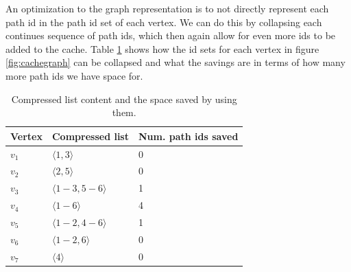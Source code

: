 An optimization to the graph representation is to not directly represent each path id in the path id set of each vertex. We can do this by collapsing each continues sequence of path ids, which then again allow for even more ids to be added to the cache. Table \ref{tab:compressedlist} shows how the id sets for each vertex in figure \ref{fig:cachegraph} can be collapsed and what the savings are in terms of how many more path ids we have space for.




\begin{table}
\center
\begin{tabular}{|l|l|l|}\hline
Vertex 	& Compressed list & Num. path ids saved \\\hline
$v_1$ 	& $\langle 1, 3 \rangle$ 	& 0 \\\hline
$v_2$ 	& $\langle2, 5 \rangle$ 	& 0 \\\hline
$v_3$ 	& $\langle 1-3, 5-6 \rangle$ 	& 1 \\\hline
$v_4$ 	& $\langle 1-6 \rangle$ 	& 4 \\\hline
$v_5$ 	& $\langle 1-2, 4-6 \rangle$ 	& 1 \\\hline
$v_6$ 	& $\langle 1-2, 6 \rangle$ 	& 0 \\\hline
$v_7$ 	& $\langle 4 \rangle$ 		& 0 \\\hline

\end{tabular}
\caption{Compressed list content and the space saved by using them.}
\label{tab:compressedlist}
\end{table}
